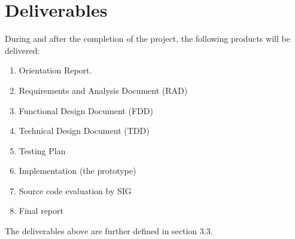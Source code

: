 \section{Deliverables}
During and after the completion of the project, the following products will be delivered:\\
\begin{enumerate}
\item Orientation Report. 
\item Requirements and Analysis Document (RAD)
\item Functional Design Document (FDD)
\item Technical Design Document (TDD)
\item Testing Plan
\item Implementation (the prototype)
\item Source code evaluation by SIG
\item Final report 
\end{enumerate}
The deliverables above are further defined in section 3.3.